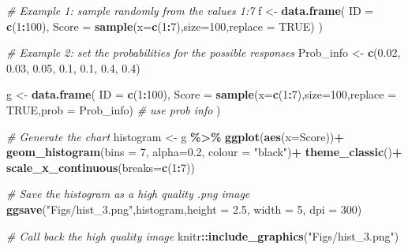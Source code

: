 \documentclass[
]{book}
\newenvironment{Shaded}{\begin{snugshade}}{\end{snugshade}}
\newcommand{\AttributeTok}[1]{\textcolor[rgb]{0.13,0.29,0.53}{#1}}
\newcommand{\CommentTok}[1]{\textcolor[rgb]{0.56,0.35,0.01}{\textit{#1}}}
\newcommand{\ConstantTok}[1]{\textcolor[rgb]{0.56,0.35,0.01}{#1}}
\newcommand{\DecValTok}[1]{\textcolor[rgb]{0.00,0.00,0.81}{#1}}
\newcommand{\FloatTok}[1]{\textcolor[rgb]{0.00,0.00,0.81}{#1}}
\newcommand{\FunctionTok}[1]{\textcolor[rgb]{0.13,0.29,0.53}{\textbf{#1}}}
\newcommand{\NormalTok}[1]{#1}
\newcommand{\OtherTok}[1]{\textcolor[rgb]{0.56,0.35,0.01}{#1}}
\newcommand{\SpecialCharTok}[1]{\textcolor[rgb]{0.81,0.36,0.00}{\textbf{#1}}}
\newcommand{\StringTok}[1]{\textcolor[rgb]{0.31,0.60,0.02}{#1}}
\begin{document}
\begin{Shaded}
\begin{Highlighting}[]
\CommentTok{\# Example 1: sample randomly from the values 1:7}
\NormalTok{f }\OtherTok{\textless{}{-}} \FunctionTok{data.frame}\NormalTok{(}
  \AttributeTok{ID =} \FunctionTok{c}\NormalTok{(}\DecValTok{1}\SpecialCharTok{:}\DecValTok{100}\NormalTok{),}
  \AttributeTok{Score =} \FunctionTok{sample}\NormalTok{(}\AttributeTok{x=}\FunctionTok{c}\NormalTok{(}\DecValTok{1}\SpecialCharTok{:}\DecValTok{7}\NormalTok{),}\AttributeTok{size=}\DecValTok{100}\NormalTok{,}\AttributeTok{replace =} \ConstantTok{TRUE}\NormalTok{)}
\NormalTok{)}


\CommentTok{\# Example 2: set the probabilities for the possible responses}
\NormalTok{Prob\_info }\OtherTok{\textless{}{-}} \FunctionTok{c}\NormalTok{(}\FloatTok{0.02}\NormalTok{, }\FloatTok{0.03}\NormalTok{, }\FloatTok{0.05}\NormalTok{, }\FloatTok{0.1}\NormalTok{, }\FloatTok{0.1}\NormalTok{, }\FloatTok{0.4}\NormalTok{, }\FloatTok{0.4}\NormalTok{)}

\NormalTok{g }\OtherTok{\textless{}{-}} \FunctionTok{data.frame}\NormalTok{(}
  \AttributeTok{ID =} \FunctionTok{c}\NormalTok{(}\DecValTok{1}\SpecialCharTok{:}\DecValTok{100}\NormalTok{),}
  \AttributeTok{Score =} \FunctionTok{sample}\NormalTok{(}\AttributeTok{x=}\FunctionTok{c}\NormalTok{(}\DecValTok{1}\SpecialCharTok{:}\DecValTok{7}\NormalTok{),}\AttributeTok{size=}\DecValTok{100}\NormalTok{,}\AttributeTok{replace =} \ConstantTok{TRUE}\NormalTok{,}\AttributeTok{prob =}\NormalTok{ Prob\_info) }\CommentTok{\# use prob info}
\NormalTok{)}

\CommentTok{\# Generate the chart}
\NormalTok{histogram }\OtherTok{\textless{}{-}}\NormalTok{ g }\SpecialCharTok{\%\textgreater{}\%}
  \FunctionTok{ggplot}\NormalTok{(}\FunctionTok{aes}\NormalTok{(}\AttributeTok{x=}\NormalTok{Score))}\SpecialCharTok{+}
  \FunctionTok{geom\_histogram}\NormalTok{(}\AttributeTok{bins =} \DecValTok{7}\NormalTok{, }\AttributeTok{alpha=}\FloatTok{0.2}\NormalTok{, }\AttributeTok{colour =} \StringTok{"black"}\NormalTok{)}\SpecialCharTok{+}
  \FunctionTok{theme\_classic}\NormalTok{()}\SpecialCharTok{+}
  \FunctionTok{scale\_x\_continuous}\NormalTok{(}\AttributeTok{breaks=}\FunctionTok{c}\NormalTok{(}\DecValTok{1}\SpecialCharTok{:}\DecValTok{7}\NormalTok{))}

\CommentTok{\# Save the histogram as a high quality .png image}
\FunctionTok{ggsave}\NormalTok{(}\StringTok{"Figs/hist\_3.png"}\NormalTok{,histogram,}\AttributeTok{height =} \FloatTok{2.5}\NormalTok{, }\AttributeTok{width =} \DecValTok{5}\NormalTok{, }\AttributeTok{dpi =} \DecValTok{300}\NormalTok{)}

\CommentTok{\# Call back the high quality image }
\NormalTok{knitr}\SpecialCharTok{::}\FunctionTok{include\_graphics}\NormalTok{(}\StringTok{"Figs/hist\_3.png"}\NormalTok{)}
\end{Highlighting}
\end{Shaded}
\end{document}
